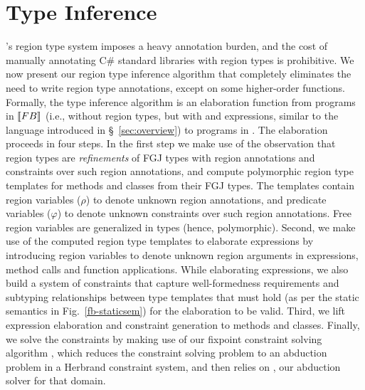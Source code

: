 \section{Type Inference}
\label{sec:type-inference}

\name's region type system imposes a heavy annotation burden, and the
cost of manually annotating C\# standard libraries with region types
is prohibitive. We now present our region type inference algorithm
that completely eliminates the need to write region type annotations,
except on some higher-order functions. Formally, the type inference
algorithm is an elaboration function from programs in $\llbracket {\sc FB} \rrbracket$
(i.e., \FB without region types, but with  and 
expressions, similar to the language introduced in
\S~\ref{sec:overview}) to programs in \FB.  The elaboration proceeds
in four steps. In the first step we make use of the observation that
region types are \emph{refinements} of FGJ types with region
annotations and constraints over such region annotations, and compute
polymorphic region type templates for methods and classes from their
FGJ types. The templates contain region variables ($\rho$) to denote
unknown region annotations, and predicate variables ($\varphi$) to
denote unknown constraints over such region annotations. Free region
variables are generalized in types (hence, polymorphic). Second, we
make use of the computed region type templates to elaborate
expressions by introducing region variables to denote unknown region
arguments in  expressions, method calls and function
applications. While elaborating expressions, we also build a system of
constraints that capture well-formedness requirements and subtyping
relationships between type templates that must hold (as per the static
semantics in Fig.~\ref{fb-staticsem}) for the elaboration to be valid.
Third, we lift expression elaboration and constraint generation to
methods and classes. Finally, we solve the constraints by making use
of our fixpoint constraint solving algorithm \csolvestar, which
reduces the constraint solving problem to an abduction problem in a
Herbrand constraint system, and then relies on \csolve, our abduction
solver for that domain. 

